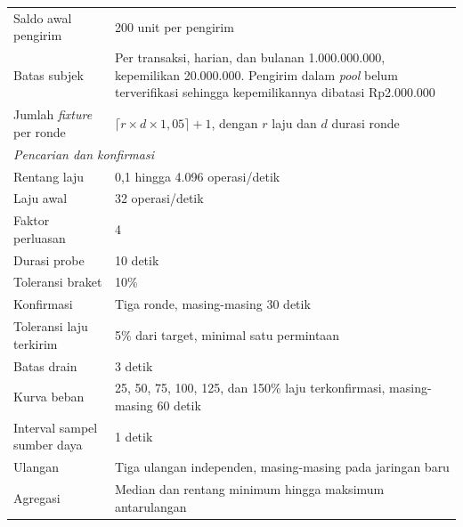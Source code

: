 \begin{longtable}{p{5.2cm} p{8.8cm}}
Saldo awal pengirim & 200 unit per pengirim \\
Batas subjek & Per transaksi, harian, dan bulanan 1.000.000.000, kepemilikan 20.000.000. Pengirim dalam \textit{pool} belum terverifikasi sehingga kepemilikannya dibatasi Rp2.000.000 \\
Jumlah \textit{fixture} per ronde & $\lceil r \times d \times 1{,}05 \rceil + 1$, dengan $r$ laju dan $d$ durasi ronde \\
\midrule
\multicolumn{2}{l}{\textit{Pencarian dan konfirmasi}} \\
Rentang laju & 0,1 hingga 4.096 operasi/detik \\
Laju awal & 32 operasi/detik \\
Faktor perluasan & 4 \\
Durasi probe & 10 detik \\
Toleransi braket & 10\% \\
Konfirmasi & Tiga ronde, masing-masing 30 detik \\
Toleransi laju terkirim & 5\% dari target, minimal satu permintaan \\
Batas drain & 3 detik \\
Kurva beban & 25, 50, 75, 100, 125, dan 150\% laju terkonfirmasi, masing-masing 60 detik \\
Interval sampel sumber daya & 1 detik \\
Ulangan & Tiga ulangan independen, masing-masing pada jaringan baru \\
Agregasi & Median dan rentang minimum hingga maksimum antarulangan \\
\end{longtable}
\endgroup
